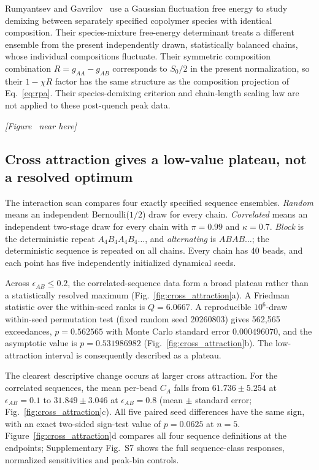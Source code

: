 \documentclass[pdflatex,sn-nature,onecolumn]{sn-jnl}
\newcommand{\figurecallout}[1]{%
  \refstepcounter{figure}\label{#1}%
  \begin{center}\textit{[Figure \thefigure\ near here]}\end{center}}
\begin{document}
Rumyantsev and Gavrilov~\cite{RumyantsevGavrilov2026} use a Gaussian fluctuation free energy to study demixing between separately specified copolymer species with identical composition. Their species-mixture free-energy determinant treats a different ensemble from the present independently drawn, statistically balanced chains, whose individual compositions fluctuate. Their symmetric composition combination $R=g_{AA}-g_{AB}$ corresponds to $S_0/2$ in the present normalization, so their $1-\chi R$ factor has the same structure as the composition projection of Eq.~\ref{eq:rpa}. Their species-demixing criterion and chain-length scaling law are not applied to these post-quench peak data.

\figurecallout{fig:sequence_response}

\subsection{Cross attraction gives a low-value plateau, not a resolved optimum}

The interaction scan compares four exactly specified sequence ensembles. \emph{Random} means an independent Bernoulli($1/2$) draw for every chain. \emph{Correlated} means an independent two-stage draw for every chain with $\pi=0.99$ and $\kappa=0.7$. \emph{Block} is the deterministic repeat $A_4B_4A_4B_4\ldots$, and \emph{alternating} is $ABAB\ldots$; the deterministic sequence is repeated on all chains. Every chain has 40 beads, and each point has five independently initialized dynamical seeds.

Across $\epsilon_{AB}\le0.2$, the correlated-sequence data form a broad plateau rather than a statistically resolved maximum (Fig.~\ref{fig:cross_attraction}a). A Friedman statistic over the within-seed ranks is $Q=6.0667$. A reproducible $10^6$-draw within-seed permutation test (fixed random seed 20260803) gives 562,565 exceedances, $p=0.562565$ with Monte Carlo standard error $0.000496070$, and the asymptotic value is $p=0.531986982$ (Fig.~\ref{fig:cross_attraction}b). The low-attraction interval is consequently described as a plateau.

The clearest descriptive change occurs at larger cross attraction. For the correlated sequences, the mean per-bead $C_A$ falls from $61.736\pm5.254$ at $\epsilon_{AB}=0.1$ to $31.849\pm3.046$ at $\epsilon_{AB}=0.8$ (mean $\pm$ standard error; Fig.~\ref{fig:cross_attraction}c). All five paired seed differences have the same sign, with an exact two-sided sign-test value of $p=0.0625$ at $n=5$. Figure~\ref{fig:cross_attraction}d compares all four sequence definitions at the endpoints; Supplementary Fig.~S7 shows the full sequence-class responses, normalized sensitivities and peak-bin controls.
\end{document}
